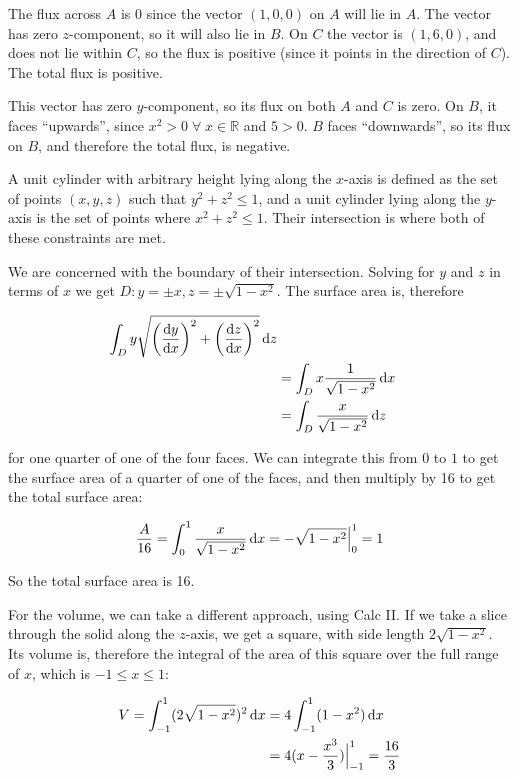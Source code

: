 The flux across $A$ is 0 since the vector $(1, 0, 0)$ on $A$ will lie in $A$. The vector has zero $z$-component, so it will also lie in $B$. On $C$ the vector is $(1, 6, 0)$, and does not lie within $C$, so the flux is positive (since it points in the direction of $C$). The total flux is positive.

This vector has zero $y$-component, so its flux on both $A$ and $C$ is zero. On $B$, it faces ``upwards'', since $x^2 > 0 \;\forall\; x \in \mathbb{R}$ and $5 > 0$. $B$ faces ``downwards'', so its flux on $B$, and therefore the total flux, is negative.


A unit cylinder with arbitrary height lying along the $x$-axis is defined as the set of points $(x, y, z)$ such that $y^2 + z^2 \leq 1$, and a unit cylinder lying along the $y$-axis is the set of points where $x^2 + z^2 \leq 1$. Their intersection is where both of these constraints are met.

We are concerned with the boundary of their intersection. Solving for $y$ and $z$ in terms of $x$ we get $D: y = \pm x, z = \pm\sqrt{1 - x^2}$. The surface area is, therefore

\begin{align*}
  \int_D y \sqrt{\left(\frac{\mathop{}\!\mathrm{d} y}{\mathop{}\!\mathrm{d} x}\right)^2 + \left(\frac{\mathop{}\!\mathrm{d} z}{\mathop{}\!\mathrm{d} x}\right)^2} \mathop{}\!\mathrm{d} z \\ &= \int_D x \frac{1}{\sqrt{1 - x^2}} \mathop{}\!\mathrm{d} x \\
  &= \int_D \frac{x}{\sqrt{1 - x^2}} \mathop{}\!\mathrm{d} z
\end{align*}

for one quarter of one of the four faces. We can integrate this from $0$ to $1$ to get the surface area of a quarter of one of the faces, and then multiply by 16 to get the total surface area:

\begin{align*}
  \frac{A}{16} = \int_0^1 \frac{x}{\sqrt{1 - x^2}} \mathop{}\!\mathrm{d} x = -\sqrt{1 - x^2} \Big|_0^1 = 1
\end{align*}

So the total surface area is 16.

For the volume, we can take a different approach, using Calc II. If we take a slice through the solid along the $z$-axis, we get a square, with side length $2\sqrt{1 - x^2}$. Its volume is, therefore the integral of the area of this square over the full range of $x$, which is $-1 \leq x \leq 1$:

\begin{align*}
  V = \int_{-1}^1 (2\sqrt{1 - x^2})^2 \mathop{}\!\mathrm{d} x &= 4 \int_{-1}^1 (1 - x^2) \mathop{}\!\mathrm{d} x \\
  &= 4(x - \frac{x^3}{3}) \Big|_{-1}^1 = \frac{16}{3}
\end{align*}

